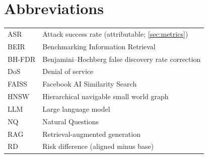\chapter*{Abbreviations}

\begin{tabular}{@{}p{3cm}l@{}}
ASR      & Attack success rate (attributable; \cref{sec:metrics}) \\
BEIR     & Benchmarking Information Retrieval \\
BH-FDR   & Benjamini--Hochberg false discovery rate correction \\
DoS      & Denial of service \\
FAISS    & Facebook AI Similarity Search \\
HNSW     & Hierarchical navigable small world graph \\
LLM      & Large language model \\
NQ       & Natural Questions \\
RAG      & Retrieval-augmented generation \\
RD       & Risk difference (aligned minus base) \\
\end{tabular}

